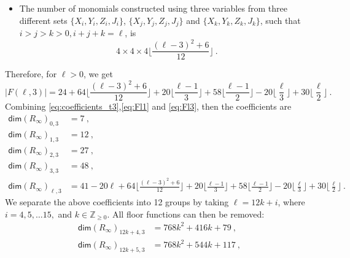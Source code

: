 \documentclass[a4paper,10pt]{article}
\newcommand{\mr}[1]{\mathsf{#1}}
\def\IZ{{\mathds{Z}}}
\begin{document}
\begin{appendix}
\begin{itemize}
The number of monomials constructed using three variables from  $\{X_i, Y_i,Z_i,J_i\}$ , such that $i>0, 3i = \ell$, is 
\begin{equation}
    20\left(\bigg\lfloor \frac{\ell}{3}\bigg\rfloor - \bigg\lfloor \frac{\ell-1}{3}\bigg\rfloor \right)~.
\end{equation}
\item 
The number of monomials constructed using three variables from three different sets $\{X_i,Y_i,Z_i,J_i\}$, $\{X_j,Y_j,Z_j,J_j\}$ and $\{X_k, Y_k, Z_k, J_k\}$, such that $i>j>k>0, i+j+k = \ell$, is
\begin{equation}
4\times 4 \times 4 \bigg\lfloor \frac{(\ell-3)^2 + 6}{12}\bigg\rfloor~.    
\end{equation}
\end{itemize}
Therefore, for $\ell > 0$, we get 
\begin{equation}
\label{eq:Fl3}
|F(\ell,3)| = 24 + 64\bigg\lfloor \frac{(\ell-3)^2 + 6}{12}\bigg\rfloor +20\bigg\lfloor \frac{\ell-1}{3}\bigg\rfloor + 58\bigg\lfloor \frac{\ell-1}{2}\bigg\rfloor -20 \bigg\lfloor \frac{\ell}{3}\bigg\rfloor+ 30\bigg\lfloor \frac{\ell}{2}\bigg\rfloor~.
\end{equation}
Combining \eqref{eq:coefficients_t3},\eqref{eq:Fl1} and \eqref{eq:Fl3}, then the coefficients are
\begin{equation}
\label{eq:coeff_t3}
\begin{aligned}
\mr{dim}(R_\infty)_{0,3} &= 7~, \\
\mr{dim}(R_\infty)_{1,3} &= 12~,\\
\mr{dim}(R_\infty)_{2,3} &= 27~,\\
\mr{dim}(R_\infty)_{3,3} & = 48~,\\
\mr{dim}(R_\infty)_{\ell,3} &= 41-20\ell + 64\bigg\lfloor \frac{(\ell-3)^2 + 6}{12}\bigg\rfloor +20\bigg\lfloor \frac{\ell-1}{3}\bigg\rfloor + 58\bigg\lfloor \frac{\ell-1}{2}\bigg\rfloor -20 \bigg\lfloor \frac{\ell}{3}\bigg\rfloor+ 30\bigg\lfloor \frac{\ell}{2}\bigg\rfloor~.
\end{aligned}
\end{equation}
We separate the above coefficients into 12 groups by taking $\ell=12 k+i$, where $i=4,5, \ldots 15,$ and $k\in\IZ_{\geq 0}$. All floor functions can then be removed:
\begin{equation}
\begin{aligned}
\mr{dim}(R_\infty)_{12k+4,3} & =768 k^2+416 k+79~ ,\\
\mr{dim}(R_\infty)_{12k+5,3} & =768 k^2+544 k+117~ ,\\

\end{aligned}
\end{equation}
\end{appendix}
\end{document}
